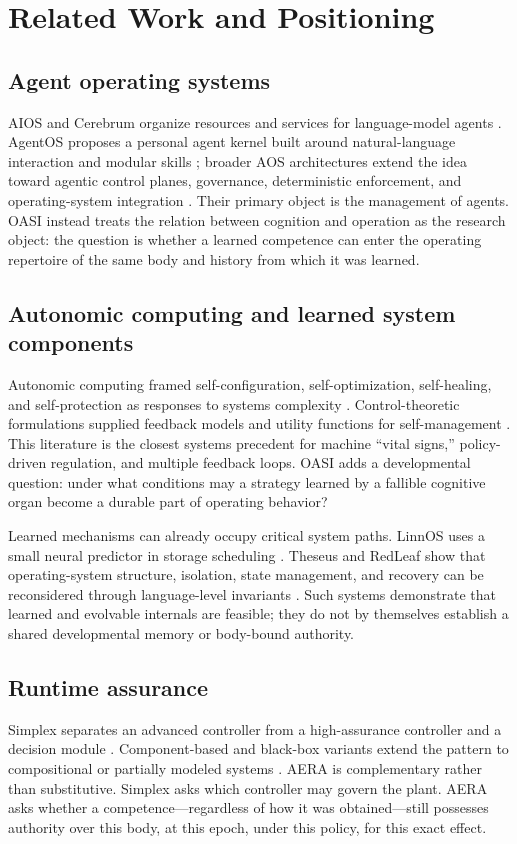 \documentclass[journal,10pt]{IEEEtran}
\newcommand{\OASI}{\textsc{OASI}}
\newcommand{\AERA}{\textsc{AERA}}
\begin{document}
\section{Related Work and Positioning}
\subsection{Agent operating systems}
AIOS and Cerebrum organize resources and services for language-model agents \cite{mei2024aios,rama2025cerebrum}. AgentOS proposes a personal agent kernel built around natural-language interaction and modular skills \cite{liu2026agentos}; broader AOS architectures extend the idea toward agentic control planes, governance, deterministic enforcement, and operating-system integration \cite{sharma2026aos}. Their primary object is the management of agents. \OASI{} instead treats the relation between cognition and operation as the research object: the question is whether a learned competence can enter the operating repertoire of the same body and history from which it was learned.

\subsection{Autonomic computing and learned system components}
Autonomic computing framed self-configuration, self-optimization, self-healing, and self-protection as responses to systems complexity \cite{kephart2003autonomic,white2004architectural}. Control-theoretic formulations supplied feedback models and utility functions for self-management \cite{diao2005control}. This literature is the closest systems precedent for machine ``vital signs,'' policy-driven regulation, and multiple feedback loops. \OASI{} adds a developmental question: under what conditions may a strategy learned by a fallible cognitive organ become a durable part of operating behavior?

Learned mechanisms can already occupy critical system paths. LinnOS uses a small neural predictor in storage scheduling \cite{hao2020linnos}. Theseus and RedLeaf show that operating-system structure, isolation, state management, and recovery can be reconsidered through language-level invariants \cite{boos2020theseus,narayanan2020redleaf}. Such systems demonstrate that learned and evolvable internals are feasible; they do not by themselves establish a shared developmental memory or body-bound authority.

\subsection{Runtime assurance}
Simplex separates an advanced controller from a high-assurance controller and a decision module \cite{sha1995simplex}. Component-based and black-box variants extend the pattern to compositional or partially modeled systems \cite{phan2017cbsa,mehmood2021blackbox}. \AERA{} is complementary rather than substitutive. Simplex asks which controller may govern the plant. \AERA{} asks whether a competence---regardless of how it was obtained---still possesses authority over this body, at this epoch, under this policy, for this exact effect.
\end{document}
